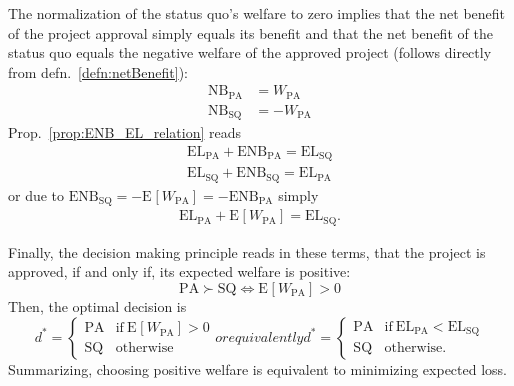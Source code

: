 \documentclass[a4paper,10pt,twoside,pagesize,abstracton]{scrartcl}
\newcommand{\E}[2][]{\mathrm{E}_{#1}\left[#2\right]} %
\newcommand{\EL}{\mathrm{EL}} %
\newcommand{\NB}{\mathrm{NB}} %
\newcommand{\ENB}{\mathrm{ENB}} %
\newcommand{\PA}{\mathrm{PA}} %
\newcommand{\SQ}{\mathrm{SQ}} %
\theoremstyle{plain}%
\theoremstyle{definition}
\theoremstyle{remark}
\begin{document}
The normalization of the status quo's welfare to zero implies that the net benefit of the project approval simply equals its benefit and that the net benefit of the status quo equals the negative welfare of the approved project (follows directly from defn.~\ref{defn:netBenefit}):
\begin{subequations}
\begin{align}
 \NB_\PA &= W_\PA\\
 \NB_\SQ &= -W_\PA
\end{align}
\end{subequations}
Prop.~\ref{prop:ENB_EL_relation} reads 
\begin{subequations}
\begin{align}
  \EL_\PA + \ENB_\PA  = \EL_\SQ\\
  \EL_\SQ + \ENB_\SQ  = \EL_\PA
\end{align}
\end{subequations}
or due to  $\ENB_\SQ	= -\E{W_\PA} = - \ENB_\PA$ simply
\begin{align}
  \EL_\PA + \E{W_\PA}  = \EL_\SQ.
\end{align}


Finally, the decision making principle reads in these terms, that the project is approved, if and only if, its expected welfare is positive:
\begin{equation}
  \label{eq:decisionMakingPrinciplePA}
 \PA \succ \SQ \Leftrightarrow \E{W_\PA} > 0
\end{equation}
Then, the optimal decision is
\begin{subequations}
\begin{equation}
 d^* = \begin{cases}
         \PA	&	\mathrm{if~} \E{W_\PA} > 0\\
         \SQ	&	\mathrm{otherwise}
        \end{cases}
\end{equation} 
or equivalently
\begin{equation}
 d^* = \begin{cases}
         \PA	&	\mathrm{if~}  \EL_\PA < \EL_\SQ\\
         \SQ	&	\mathrm{otherwise}.
        \end{cases}
\end{equation}
\end{subequations}
Summarizing, choosing positive welfare is equivalent to minimizing expected loss.
\end{document}
